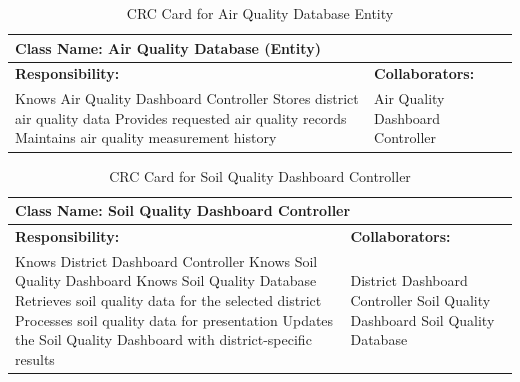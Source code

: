 \documentclass[]{article}
\begin{document}
\begin{table}[H]
    \centering
    \caption{CRC Card for Air Quality Database Entity}
    \vspace{1mm}
    \begin{tabular}{|p{7.5cm}|p{7.5cm}|}
    \hline 
    \multicolumn{2}{|l|}{\textbf{Class Name: Air Quality Database (Entity)}} \\
    \hline
    \textbf{Responsibility:} & \textbf{Collaborators:} \\
    \hline
        Knows Air Quality Dashboard Controller \newline
        Stores district air quality data \newline
        Provides requested air quality records \newline
        Maintains air quality measurement history \newline
        &
        Air Quality Dashboard Controller \\
    \hline
    \end{tabular}
\end{table}
\begin{table}[H]
    \centering
    \caption{CRC Card for Soil Quality Dashboard Controller}
    \vspace{1mm}
    \begin{tabular}{|p{7.5cm}|p{7.5cm}|}
    \hline 
    \multicolumn{2}{|l|}{\textbf{Class Name: Soil Quality Dashboard Controller}} \\
    \hline
    \textbf{Responsibility:} & \textbf{Collaborators:} \\
    \hline
        Knows District Dashboard Controller \newline
        Knows Soil Quality Dashboard \newline
        Knows Soil Quality Database \newline
        Retrieves soil quality data for the selected district \newline
        Processes soil quality data for presentation \newline
        Updates the Soil Quality Dashboard with district-specific results \newline
        &
        District Dashboard Controller \newline
        Soil Quality Dashboard \newline
        Soil Quality Database \\
    \hline
    \end{tabular}
\end{table}
\end{document}
